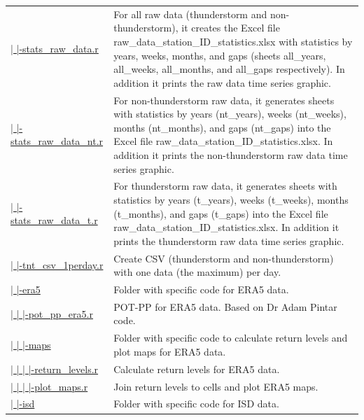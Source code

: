 \documentclass[12pt,oneside]{reedthesis}
\begin{document}
\begin{longtable}[t]{>{\raggedright\arraybackslash}p{1.3in}>{\raggedright\arraybackslash}p{4.9in}}
\href{ftp://ftp.geocorp.co/windthesis/code/pot_pp/statistics_raw_data.r}{  |    |-stats\_raw\_data.r} & For all raw data (thunderstorm and non-thunderstorm), it creates the Excel file raw\_data\_station\_ID\_statistics.xlsx with statistics by years, weeks, months, and gaps (sheets all\_years, all\_weeks, all\_months, and all\_gaps respectively). In addition it prints the raw data time series graphic.\\
\href{ftp://ftp.geocorp.co/windthesis/code/pot_pp/statistics_raw_data_nt.r}{  |    |-stats\_raw\_data\_nt.r} & For non-thunderstorm raw data, it generates sheets with statistics by years (nt\_years), weeks (nt\_weeks), months (nt\_months), and gaps (nt\_gaps) into the Excel file raw\_data\_station\_ID\_statistics.xlsx. In addition it prints the non-thunderstorm raw data time series graphic.\\
\href{ftp://ftp.geocorp.co/windthesis/code/pot_pp/statistics_raw_data_t.r}{  |    |-stats\_raw\_data\_t.r} & For thunderstorm raw data, it generates sheets with statistics by years (t\_years), weeks (t\_weeks), months (t\_months), and gaps (t\_gaps) into the Excel file raw\_data\_station\_ID\_statistics.xlsx. In addition it prints the thunderstorm raw data time series graphic.\\
\href{ftp://ftp.geocorp.co/windthesis/code/pot_pp/write_t_nt_csv_one_data_per_day.r}{  |    |-tnt\_csv\_1perday.r} & Create CSV (thunderstorm and non-thunderstorm) with one data (the maximum) per day.\\
\href{ftp://ftp.geocorp.co/windthesis/code/pot_pp/era5/}{  |    |-era5} & Folder with specific code for ERA5 data.\\
\href{ftp://ftp.geocorp.co/windthesis/code/pot_pp/era5/pot_pp_era5.r}{  |    |    |-pot\_pp\_era5.r} & POT-PP for ERA5 data. Based on Dr Adam Pintar code.\\
\href{ftp://ftp.geocorp.co/windthesis/code/pot_pp/era5/maps/}{  |    |    |-maps} & Folder with specific code to calculate return levels and plot maps for ERA5 data.\\
\href{ftp://ftp.geocorp.co/windthesis/code/pot_pp/era5/maps/return_levels.r}{  |    |    |    |-return\_levels.r} & Calculate return levels for ERA5 data.\\
\href{ftp://ftp.geocorp.co/windthesis/code/pot_pp/era5/maps/plot_maps.r}{  |    |    |    |-plot\_maps.r} & Join return levels to cells and plot ERA5 maps.\\
\href{ftp://ftp.geocorp.co/windthesis/code/pot_pp/isd/}{  |    |-isd} & Folder with specific code for ISD data.\\

\end{longtable}
\end{document}
